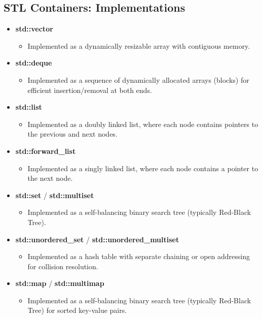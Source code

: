 \documentclass{report}
\begin{document}
    \subsection{STL Containers: Implementations}
\begin{itemize}
    \item \textbf{std::vector}
    \begin{itemize}
        \item Implemented as a dynamically resizable array with contiguous memory.
    \end{itemize}

    \item \textbf{std::deque}
    \begin{itemize}
        \item Implemented as a sequence of dynamically allocated arrays (blocks) for efficient insertion/removal at both ends.
    \end{itemize}

    \item \textbf{std::list}
    \begin{itemize}
        \item Implemented as a doubly linked list, where each node contains pointers to the previous and next nodes.
    \end{itemize}

    \item \textbf{std::forward\_list}
    \begin{itemize}
        \item Implemented as a singly linked list, where each node contains a pointer to the next node.
    \end{itemize}

    \item \textbf{std::set} / \textbf{std::multiset}
    \begin{itemize}
        \item Implemented as a self-balancing binary search tree (typically Red-Black Tree).
    \end{itemize}

    \item \textbf{std::unordered\_set} / \textbf{std::unordered\_multiset}
    \begin{itemize}
        \item Implemented as a hash table with separate chaining or open addressing for collision resolution.
    \end{itemize}

    \item \textbf{std::map} / \textbf{std::multimap}
    \begin{itemize}
        \item Implemented as a self-balancing binary search tree (typically Red-Black Tree) for sorted key-value pairs.
    \end{itemize}


\end{itemize}
\end{document}
